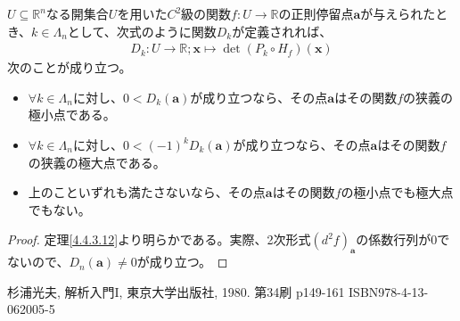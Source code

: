 \documentclass[dvipdfmx]{jsarticle}
\begin{document}
\begin{thm}\label{4.4.3.13}
$U \subseteq \mathbb{R}^{n}$なる開集合$U$を用いた$C^{2}$級の関数$f:U \rightarrow \mathbb{R}$の正則停留点$\mathbf{a}$が与えられたとき、$k \in \varLambda_{n}$として、次式のように関数$D_{k}$が定義されれば、
\begin{align*}
D_{k}:U \rightarrow \mathbb{R};\mathbf{x} \mapsto \det{\left( P_{k} \circ H_{f} \right)\left( \mathbf{x} \right)}
\end{align*}
次のことが成り立つ。
\begin{itemize}
\item
  $\forall k \in \varLambda_{n}$に対し、$0 < D_{k}\left( \mathbf{a} \right)$が成り立つなら、その点$\mathbf{a}$はその関数$f$の狭義の極小点である。
\item
  $\forall k \in \varLambda_{n}$に対し、$0 < ( - 1)^{k}D_{k}\left( \mathbf{a} \right)$が成り立つなら、その点$\mathbf{a}$はその関数$f$の狭義の極大点である。
\item
  上のこといずれも満たさないなら、その点$\mathbf{a}$はその関数$f$の極小点でも極大点でもない。
\end{itemize}
\end{thm}
\begin{proof} 定理\ref{4.4.3.12}より明らかである。実際、2次形式$\left( d^{2}f \right)_{\mathbf{a}}$の係数行列が$0$でないので、$D_{n}\left( \mathbf{a} \right) \neq 0$が成り立つ。
\end{proof}
\begin{thebibliography}{50}
  杉浦光夫, 解析入門I, 東京大学出版社, 1980. 第34刷 p149-161 ISBN978-4-13-062005-5
\end{thebibliography}
\end{document}
